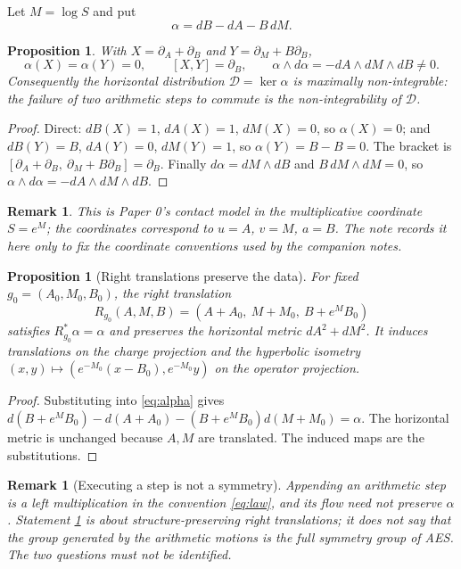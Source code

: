 \documentclass[11pt]{article}
\newtheorem{proposition}[theorem]{Proposition}
\newtheorem{remark}[theorem]{Remark}
\begin{document}
Let $M=\log S$ and put
\begin{equation}
\label{eq:alpha}
\alpha=dB-dA-B\,dM .
\end{equation}

\begin{proposition}
\label{prop:contact}
With $X=\partial_A+\partial_B$ and $Y=\partial_M+B\partial_B$,
\[
\alpha(X)=\alpha(Y)=0,\qquad [X,Y]=\partial_B,\qquad
\alpha\wedge d\alpha=-dA\wedge dM\wedge dB\ne0 .
\]
Consequently the horizontal distribution $\mathcal D=\ker\alpha$ is maximally
non-integrable: the failure of two arithmetic steps to commute is the
non-integrability of $\mathcal D$.
\end{proposition}

\begin{proof}
Direct: $dB(X)=1$, $dA(X)=1$, $dM(X)=0$, so $\alpha(X)=0$; and $dB(Y)=B$,
$dA(Y)=0$, $dM(Y)=1$, so $\alpha(Y)=B-B=0$. The bracket is
$[\partial_A+\partial_B,\ \partial_M+B\partial_B]=\partial_B$. Finally
$d\alpha=dM\wedge dB$ and $B\,dM\wedge dM=0$, so
$\alpha\wedge d\alpha=-dA\wedge dM\wedge dB$.
\end{proof}

\begin{remark}
This is Paper 0's contact model in the multiplicative coordinate $S=e^M$; the
coordinates correspond to $u=A$, $v=M$, $a=B$. The note records it here only to
fix the coordinate conventions used by the companion notes.
\end{remark}

\begin{proposition}[Right translations preserve the data]
\label{prop:right-translation}
For fixed $g_0=(A_0,M_0,B_0)$, the right translation
\[
R_{g_0}(A,M,B)=(A+A_0,\ M+M_0,\ B+e^MB_0)
\]
satisfies $R_{g_0}^*\alpha=\alpha$ and preserves the horizontal metric
$dA^2+dM^2$. It induces translations on the charge projection and the hyperbolic
isometry $(x,y)\mapsto(e^{-M_0}(x-B_0),e^{-M_0}y)$ on the operator projection.
\end{proposition}

\begin{proof}
Substituting into \eqref{eq:alpha} gives
$d(B+e^MB_0)-d(A+A_0)-(B+e^MB_0)d(M+M_0)=\alpha$. The horizontal metric is
unchanged because $A,M$ are translated. The induced maps are the substitutions.
\end{proof}

\begin{remark}[Executing a step is not a symmetry]
\label{rem:not-symmetry}
Appending an arithmetic step is a \emph{left} multiplication in the convention
\eqref{eq:law}, and its flow need not preserve $\alpha$. Statement
\ref{prop:right-translation} is about structure-preserving right translations;
it does not say that the group generated by the arithmetic motions is the full
symmetry group of AES. The two questions must not be identified.
\end{remark}
\end{document}
